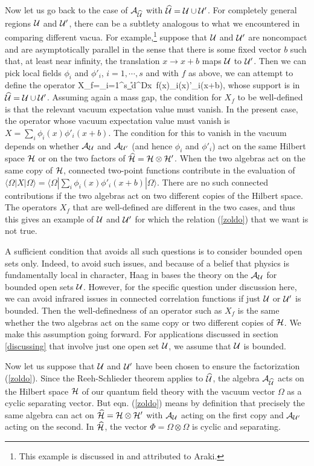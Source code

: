 \documentclass[12pt]{article}
\def\h{\widehat}
\def\ra{\rangle}
\def\la{\langle}
\numberwithin{equation}{section}
\def\d{\mathrm d}
\def\A{{\mathcal A}}
\begin{document}
Now let us go back to the case of $\A_{\h\U}$ with $\h\U=\U\cup\U'$.   For completely general regions ${\mathcal U}$ and ${\mathcal U}'$, there can
be a subtlety analogous to what we encountered in comparing different vacua.  For example,\footnote{This example is discussed
in \cite{Buchholz} and attributed to Araki.}  suppose that ${\mathcal U}$ and ${\mathcal U}'$ are noncompact
and are asymptotically parallel in the sense that there is some fixed vector $b$ such that, at least near infinity, the translation
$x\to x+b$ maps ${\mathcal U}$ to ${\mathcal U}'$.  Then we can pick local fields $\phi_i$ and $\phi'_i$, $i=1,\cdots ,s$  and with $f$ as above,
 we can attempt to define the operator
\be\label{pilbo} X_f=\sum_{i=1}^s\int_\U \d^Dx \,f(x)\phi_i(x)\phi'_i(x+b), \ee
whose support is in $\h\U=\U\cup\U'$.
Assuming again a mass gap, the condition for   $X_f$  to be well-defined is that the relevant vacuum expectation value must vanish.
In the present case, the operator whose vacuum expectation value must vanish
 is $X=\sum_i \phi_i(x)\phi'_i(x+b)$.    The condition for this to vanish in the vacuum
 depends on whether $\A_\U$ and $\A_{\U'}$ (and hence $\phi_i$ and $\phi'_i$) act on the same Hilbert space ${\mathcal H}$ or
on the two factors of $\h\H=\H\otimes \H'$.  When the two algebras act on the same copy of ${\mathcal H}$,
connected two-point functions contribute in the evaluation of $\la\Omega|X|\Omega\ra =\la\Omega|\sum_i \phi_i(x)\phi'_i(x+b) |\Omega\ra$.
There are no such connected contributions if the two algebras act on two different copies of the Hilbert space.
The operators $X_f$ that are well-defined are different in the two cases, and  thus this gives an example of ${\mathcal U}$ and ${\mathcal U}'$ for which the relation (\ref{zoldo}) that we
want is not true.


A sufficient condition that avoids all such questions  is to consider bounded open sets only.
 Indeed, to avoid such issues,  and because of a belief that physics
is fundamentally local in character,
Haag in \cite{Haag} bases the theory on the $\A_\U$
for bounded open sets ${\mathcal U}$.   However, for the specific question under discussion here, we can avoid infrared issues in connected
correlation functions if just ${\mathcal U}$ or ${\mathcal U}'$ is bounded.  Then the well-definedness of an operator such as $X_f$ is the same whether
the two algebras act on the same copy or two different copies of ${\mathcal H}$.  We make this assumption going forward.  For applications
discussed in section \ref{discussing} that involve just one open set ${\mathcal U}$, we assume that ${\mathcal U}$ is bounded.


Now let us suppose that ${\mathcal U}$ and ${\mathcal U}'$ have been chosen to ensure the factorization (\ref{zoldo}).  
Since the Reeh-Schlieder theorem applies to $\h\U$, the algebra $\A_{\h\U}$ acts on the Hilbert space ${\mathcal H}$ of
our quantum field theory with  the vacuum vector $\Omega$ as a cyclic separating vector.   But
eqn. (\ref{zoldo}) means by definition that precisely the same algebra can
act on  $\h\H=\H\otimes\H'$  with $\A_\U$ acting on the first copy and $\A_{\U'}$ acting
on the second.   In $\h\H$, the vector $\Phi=\Omega\otimes \Omega$ is cyclic and separating.
\end{document}
